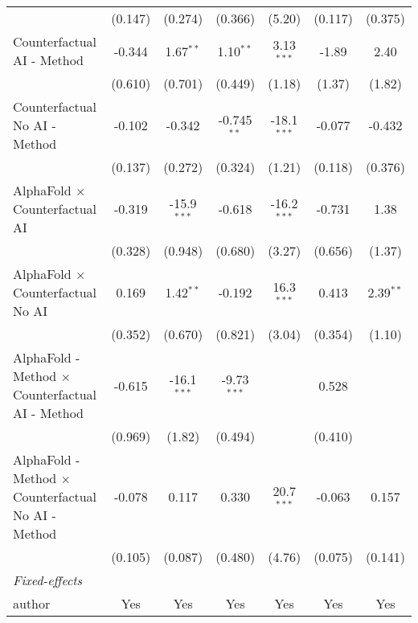 \begin{tabular}{lcccccc}
                                                              & (0.147)      & (0.274)       & (0.366)       & (5.20)        & (0.117)      & (0.375)\\   
   Counterfactual AI - Method                                 & -0.344       & 1.67$^{**}$   & 1.10$^{**}$   & 3.13$^{***}$  & -1.89        & 2.40\\   
                                                              & (0.610)      & (0.701)       & (0.449)       & (1.18)        & (1.37)       & (1.82)\\   
   Counterfactual No AI - Method                              & -0.102       & -0.342        & -0.745$^{**}$ & -18.1$^{***}$ & -0.077       & -0.432\\   
                                                              & (0.137)      & (0.272)       & (0.324)       & (1.21)        & (0.118)      & (0.376)\\   
   AlphaFold $\times$ Counterfactual AI                       & -0.319       & -15.9$^{***}$ & -0.618        & -16.2$^{***}$ & -0.731       & 1.38\\   
                                                              & (0.328)      & (0.948)       & (0.680)       & (3.27)        & (0.656)      & (1.37)\\   
   AlphaFold $\times$ Counterfactual No AI                    & 0.169        & 1.42$^{**}$   & -0.192        & 16.3$^{***}$  & 0.413        & 2.39$^{**}$\\   
                                                              & (0.352)      & (0.670)       & (0.821)       & (3.04)        & (0.354)      & (1.10)\\   
   AlphaFold - Method $\times$ Counterfactual AI - Method     & -0.615       & -16.1$^{***}$ & -9.73$^{***}$ &               & 0.528        &   \\   
                                                              & (0.969)      & (1.82)        & (0.494)       &               & (0.410)      &   \\   
   AlphaFold - Method $\times$ Counterfactual No AI - Method  & -0.078       & 0.117         & 0.330         & 20.7$^{***}$  & -0.063       & 0.157\\   
                                                              & (0.105)      & (0.087)       & (0.480)       & (4.76)        & (0.075)      & (0.141)\\   
   \midrule
   \emph{Fixed-effects}\\
   author                                                     & Yes          & Yes           & Yes           & Yes           & Yes          & Yes\\  

\end{tabular}
